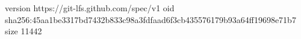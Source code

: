 version https://git-lfs.github.com/spec/v1
oid sha256:45aa1be3317bd7432b833c98a3fdfaad6f3cb435576179b93a64ff19698e71b7
size 11442
